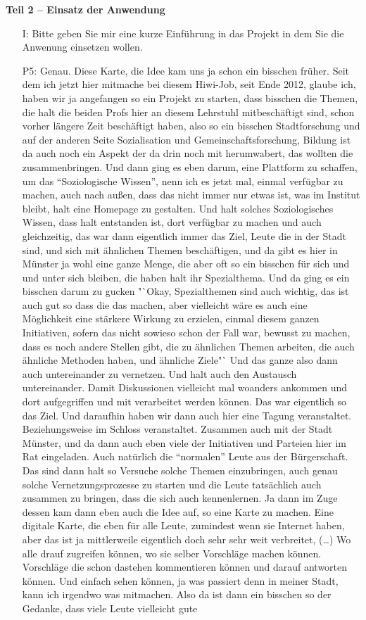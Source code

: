 \textbf{Teil 2 -- Einsatz der Anwendung}
\begin{itemize}
    \item[I:] Bitte geben Sie mir eine kurze Einf{\"u}hrung in das Projekt in dem Sie die Anwenung einsetzen wollen.
    \item[P5:] Genau. Diese Karte, die Idee kam uns ja schon ein bisschen fr{\"u}her. Seit dem ich jetzt hier mitmache bei diesem Hiwi-Job, seit Ende 2012, glaube ich, haben wir ja angefangen so ein Projekt zu starten, dass bisschen die Themen, die halt die beiden Profs hier an diesem Lehrstuhl mitbesch{\"a}ftigt sind, schon vorher l{\"a}ngere Zeit besch{\"a}ftigt haben, also so ein bisschen Stadtforschung und auf der anderen Seite Sozialisation und Gemeinschaftsforschung, Bildung ist da auch noch ein Aspekt der da drin noch mit herumwabert, das wollten die zusammenbringen. Und dann ging es eben darum, eine Plattform zu schaffen, um das "`Soziologische Wissen"', nenn ich es jetzt mal, einmal verf{\"u}gbar zu machen, auch nach au{\ss}en, dass das nicht immer nur etwas ist, was im Institut bleibt, halt eine Homepage zu gestalten. Und halt solches Soziologisches Wissen, dass halt entstanden ist, dort verf{\"u}gbar zu machen und auch gleichzeitig, das war dann eigentlich immer das Ziel, Leute die in der Stadt sind, und sich mit {\"a}hnlichen Themen besch{\"a}ftigen, und da gibt es hier in M{\"u}nster ja wohl eine ganze Menge, die aber oft so ein bisschen f{\"u}r sich und und unter sich bleiben, die haben halt ihr Spezialthema. Und da ging es ein bisschen darum zu gucken "`Okay, Spezialthemen sind auch wichtig, das ist auch gut so dass die das machen, aber vielleicht w{\"a}re es auch eine M{\"o}glichkeit eine st{\"a}rkere Wirkung zu erzielen, einmal diesem ganzen Initiativen, sofern das nicht sowieso schon der Fall war, bewusst zu machen, dass es noch andere Stellen gibt, die zu {\"a}hnlichen Themen arbeiten, die auch {\"a}hnliche Methoden haben, und {\"a}hnliche Ziele"` Und das ganze also dann auch untereinander zu vernetzen. Und halt auch den Austausch untereinander. Damit Diskussionen vielleicht mal woanders ankommen und dort aufgegriffen und mit verarbeitet werden k{\"o}nnen. Das war eigentlich so das Ziel. Und daraufhin haben wir dann auch hier eine Tagung veranstaltet. Beziehungsweise im Schloss veranstaltet. Zusammen auch mit der Stadt M{\"u}nster, und da dann auch eben viele der Initiativen und Parteien hier im Rat eingeladen. Auch nat{\"u}rlich die "`normalen"' Leute aus der B{\"u}rgerschaft. Das sind dann halt so Versuche solche Themen einzubringen, auch genau solche Vernetzungsprozesse zu starten und die Leute tats{\"a}chlich auch zusammen zu bringen, dass die sich auch kennenlernen. Ja dann im Zuge dessen kam dann eben auch die Idee auf, so eine Karte zu machen. Eine digitale Karte, die eben f{\"u}r alle Leute, zumindest wenn sie Internet haben, aber das ist ja mittlerweile eigentlich doch sehr sehr weit verbreitet, (\dots) Wo alle drauf zugreifen k{\"o}nnen, wo sie selber Vorschl{\"a}ge machen k{\"o}nnen. Vorschl{\"a}ge die schon dastehen kommentieren k{\"o}nnen und darauf antworten k{\"o}nnen. Und einfach sehen k{\"o}nnen, ja was passiert denn in meiner Stadt, kann ich irgendwo was mitmachen. Also da ist dann ein bisschen so der Gedanke, dass viele Leute vielleicht gute 
\end{itemize}
